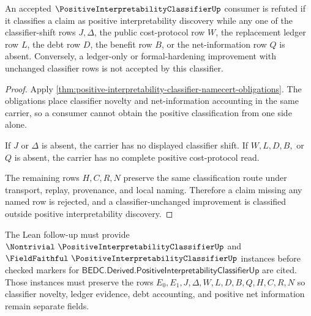 \begin{theorem}
\label{thm:positive-interpretability-classifier-falsifiable-shift}
An accepted $\PositiveInterpretabilityClassifierUp$ consumer is refuted if it classifies a claim as positive interpretability discovery while any one of the classifier-shift rows $J,\Delta$, the public cost-protocol row $W$, the replacement ledger row $L$, the debt row $D$, the benefit row $B$, or the net-information row $Q$ is absent. Conversely, a ledger-only or formal-hardening improvement with unchanged classifier rows is not accepted by this classifier.
\end{theorem}
\begin{proof}
Apply \autoref{thm:positive-interpretability-classifier-namecert-obligations}. The obligations place classifier novelty and net-information accounting in the same carrier, so a consumer cannot obtain the positive classification from one side alone.

If $J$ or $\Delta$ is absent, the carrier has no displayed classifier shift. If $W,L,D,B,$ or $Q$ is absent, the carrier has no complete positive cost-protocol read.

The remaining rows $H,C,R,N$ preserve the same classification route under transport, replay, provenance, and local naming. Therefore a claim missing any named row is rejected, and a classifier-unchanged improvement is classified outside positive interpretability discovery.
\end{proof}



The Lean follow-up must provide $\Nontrivial\ \PositiveInterpretabilityClassifierUp$ and $\FieldFaithful\ \PositiveInterpretabilityClassifierUp$ instances before checked markers for $\mathsf{BEDC.Derived.PositiveInterpretabilityClassifierUp}$ are cited. Those instances must preserve the rows $E_0,E_1,J,\Delta,W,L,D,B,Q,H,C,R,N$ so classifier novelty, ledger evidence, debt accounting, and positive net information remain separate fields.

